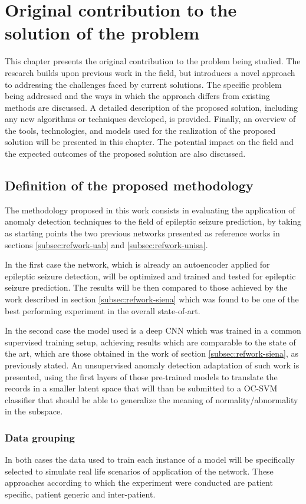 \chapter{Original contribution to the solution of the problem}
This chapter presents the original contribution to the problem being studied. The research builds upon previous work in the field, but introduces a novel approach to addressing the challenges faced by current solutions. The specific problem being addressed and the ways in which the approach differs from existing methods are discussed. A detailed description of the proposed solution, including any new algorithms or techniques developed, is provided. Finally, an overview of the tools, technologies, and models used for the realization of the proposed solution will be presented in this chapter. The potential impact on the field and the expected outcomes of the proposed solution are also discussed.

\section{Definition of the proposed methodology}
The methodology proposed in this work consists in evaluating the application of anomaly detection techniques to the field of epileptic seizure prediction, by taking as starting points the two previous networks presented as reference works in sections \ref{subsec:refwork-uab} and \ref{subsec:refwork-unisa}.

In the first case the network, which is already an autoencoder applied for epileptic seizure detection, will be optimized and trained and tested for epileptic seizure prediction. The results will be then compared to those achieved by the work described in section \ref{subsec:refwork-siena} which was found to be one of the best performing experiment in the overall state-of-art.

In the second case the model used is a deep \gls{CNN} which was trained in a common supervised training setup, achieving results which are comparable to the state of the art, which are those obtained in the work of section \ref{subsec:refwork-siena}, as previously stated. An unsupervised anomaly detection adaptation of such work is presented, using the first layers of those pre-trained models to translate the records in a smaller latent space that will than be submitted to a \gls{OC-SVM} classifier that should be able to generalize the meaning of normality/abnormality in the subspace.

\subsection{Data grouping} \label{subsec:data-grouping}
In both cases the data used to train each instance of a model will be specifically selected to simulate real life scenarios of application of the network. These approaches according to which the experiment were conducted are patient specific, patient generic and inter-patient.


